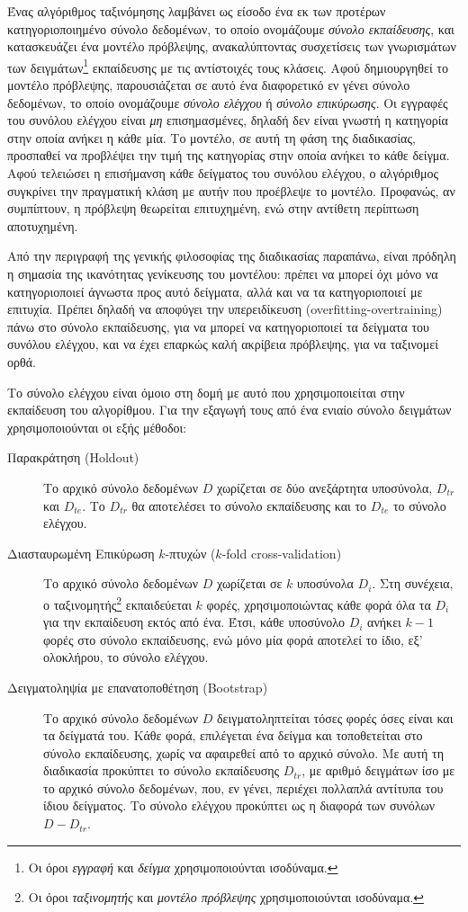 Ένας αλγόριθμος ταξινόμησης λαμβάνει ως είσοδο ένα εκ των προτέρων κατηγοριοποιημένο σύνολο δεδομένων, το οποίο ονομάζουμε \emph{σύνολο εκπαίδευσης}, και κατασκευάζει ένα μοντέλο πρόβλεψης, ανακαλύπτοντας συσχετίσεις των γνωρισμάτων των δειγμάτων\footnote{Οι όροι \emph{εγγραφή} και \emph{δείγμα} χρησιμοποιούνται ισοδύναμα.} εκπαίδευσης με τις αντίστοιχές τους κλάσεις. Αφού δημιουργηθεί το μοντέλο πρόβλεψης, παρουσιάζεται σε αυτό ένα διαφορετικό εν γένει σύνολο δεδομένων, το οποίο ονομάζουμε \emph{σύνολο ελέγχου} ή \emph{σύνολο επικύρωσης}. Οι εγγραφές του συνόλου ελέγχου είναι \emph{μη} επισημασμένες, δηλαδή δεν είναι γνωστή η κατηγορία στην οποία ανήκει η κάθε μία. Το μοντέλο, σε αυτή τη φάση της διαδικασίας, προσπαθεί να προβλέψει την τιμή της κατηγορίας στην οποία ανήκει το κάθε δείγμα. Αφού τελειώσει η επισήμανση κάθε δείγματος του συνόλου ελέγχου, ο αλγόριθμος συγκρίνει την πραγματική κλάση με αυτήν που προέβλεψε το μοντέλο. Προφανώς, αν συμπίπτουν, η πρόβλεψη θεωρείται επιτυχημένη, ενώ στην αντίθετη περίπτωση αποτυχημένη.

Από την περιγραφή της γενικής φιλοσοφίας της διαδικασίας παραπάνω, είναι πρόδηλη η σημασία της ικανότητας γενίκευσης του μοντέλου: πρέπει να μπορεί όχι μόνο να κατηγοριοποιεί άγνωστα προς αυτό δείγματα, αλλά και να τα κατηγοριοποιεί με επιτυχία. Πρέπει δηλαδή να αποφύγει την υπερειδίκευση (overfitting-overtraining) πάνω στο σύνολο εκπαίδευσης, για να μπορεί να κατηγοριοποιεί τα δείγματα του συνόλου ελέγχου, και να έχει επαρκώς καλή ακρίβεια πρόβλεψης, για να ταξινομεί ορθά.

Το σύνολο ελέγχου είναι όμοιο στη δομή με αυτό που χρησιμοποιείται στην εκπαίδευση του αλγορίθμου. Για την εξαγωγή τους από ένα ενιαίο σύνολο δειγμάτων χρησιμοποιούνται οι εξής μέθοδοι:

\begin{description}
\item[Παρακράτηση (Holdout)] Το αρχικό σύνολο δεδομένων $D$ χωρίζεται σε δύο ανεξάρτητα υποσύνολα, $D_{tr}$ και $D_{te}$. Το $D_{tr}$ θα αποτελέσει το σύνολο εκπαίδευσης και το $D_{te}$ το σύνολο ελέγχου.
\item[Διασταυρωμένη Επικύρωση $k$-πτυχών ($k$-fold cross-validation)] Το αρχικό σύνολο δεδομένων $D$ χωρίζεται σε $k$ υποσύνολα $D_{i}$. Στη συνέχεια, ο ταξινομητής\footnote{Οι όροι \emph{ταξινομητής} και \emph{μοντέλο πρόβλεψης} χρησιμοποιούνται ισοδύναμα.} εκπαιδεύεται $k$ φορές, χρησιμοποιώντας κάθε φορά όλα τα $D_{i}$ για την εκπαίδευση εκτός από ένα. Έτσι, κάθε υποσύνολο $D_{i}$ ανήκει $k - 1$ φορές στο σύνολο εκπαίδευσης, ενώ μόνο μία φορά αποτελεί το ίδιο, εξ' ολοκλήρου, το σύνολο ελέγχου.
\item[Δειγματοληψία με επανατοποθέτηση (Bootstrap)] Το αρχικό σύνολο δεδομένων $D$ δειγματοληπτείται τόσες φορές όσες είναι και τα δείγματά του. Κάθε φορά, επιλέγεται ένα δείγμα και τοποθετείται στο σύνολο εκπαίδευσης, χωρίς να αφαιρεθεί από το αρχικό σύνολο. Με αυτή τη διαδικασία προκύπτει το σύνολο εκπαίδευσης $D_{tr}$, με αριθμό δειγμάτων ίσο με το αρχικό σύνολο δεδομένων, που, εν γένει, περιέχει πολλαπλά αντίτυπα του ίδιου δείγματος. Το σύνολο ελέγχου προκύπτει ως η διαφορά των συνόλων $D - D_{tr}$.
\end{description}


